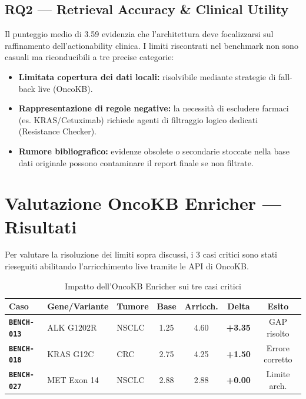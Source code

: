 \documentclass[12pt, a4paper]{article}
\newcommand{\pass}[1]{{\color{passgreen}\textbf{#1}}}
\newcommand{\warn}[1]{{\color{warnAmber}\textbf{#1}}}
\newcommand{\bench}[1]{{\texttt{\textbf{#1}}}}
\begin{document}
\subsection{RQ2 --- Retrieval Accuracy \& Clinical Utility}
Il punteggio medio di 3.59 evidenzia che l'architettura deve focalizzarsi sul raffinamento dell'actionability clinica. I limiti riscontrati nel benchmark non sono casuali ma riconducibili a tre precise categorie:
\begin{itemize}[leftmargin=1.6em, itemsep=2pt]
  \item \textbf{Limitata copertura dei dati locali:} risolvibile mediante strategie di fall-back live (OncoKB).
  \item \textbf{Rappresentazione di regole negative:} la necessità di escludere farmaci (es. KRAS/Cetuximab) richiede agenti di filtraggio logico dedicati (Resistance Checker).
  \item \textbf{Rumore bibliografico:} evidenze obsolete o secondarie stoccate nella base dati originale possono contaminare il report finale se non filtrate.
\end{itemize}

\section{Valutazione OncoKB Enricher --- Risultati}

Per valutare la risoluzione dei limiti sopra discussi, i 3 casi critici sono stati rieseguiti abilitando l'arricchimento live tramite le API di OncoKB.

\begin{table}[ht]
\centering\renewcommand{\arraystretch}{1.3}
\caption{Impatto dell'OncoKB Enricher sui tre casi critici}
\begin{tabular}{lllcccc}
\toprule
\rowcolor{primaryblue}
\color{white}\textbf{Caso} & \color{white}\textbf{Gene/Variante} & \color{white}\textbf{Tumore} & \color{white}\textbf{Base} & \color{white}\textbf{Arricch.} & \color{white}\textbf{Delta} & \color{white}\textbf{Esito} \\
\midrule
\bench{BENCH-013} & ALK G1202R & NSCLC & 1.25 & 4.60 & \pass{+3.35} & GAP risolto \\
\rowcolor{roweven}
\bench{BENCH-018} & KRAS G12C & CRC & 2.75 & 4.25 & \pass{+1.50} & Errore corretto \\
\bench{BENCH-027} & MET Exon 14 & NSCLC & 2.88 & 2.88 & \warn{+0.00} & Limite arch. \\
\bottomrule
\end{tabular}
\end{table}
\end{document}
